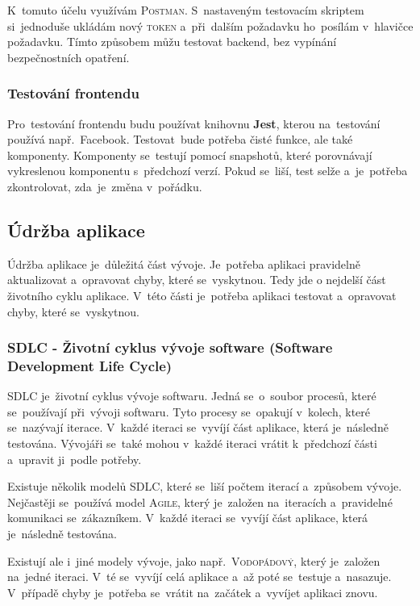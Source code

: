 \documentclass[14pt,a4paper]{article}
\begin{document}
        K~tomuto účelu využívám \textsc{Postman}. S~nastaveným testovacím skriptem si~jednoduše ukládám nový \textsc{token} a~při~dalším požadavku ho~posílám v~hlavičce požadavku. Tímto způsobem můžu testovat backend, bez vypínání bezpečnostních opatření.

        \subsubsection{Testování frontendu}
        Pro~testování frontendu budu používat knihovnu \textbf{Jest}, kterou na~testování používá např.~Facebook. Testovat~bude potřeba čisté funkce, ale také komponenty. Komponenty se~testují pomocí snapshotů, které porovnávají vykreslenou komponentu s~předchozí verzí. Pokud se~liší, test selže a~je~potřeba zkontrolovat, zda~je~změna v~pořádku. \parencite{jestjsTestingReact}

        \subsection{Údržba aplikace}
        Údržba aplikace je~důležitá část vývoje. Je~potřeba aplikaci pravidelně aktualizovat a~opravovat chyby, které se~vyskytnou.
        Tedy jde o nejdelší část životního cyklu aplikace. V~této části je~potřeba aplikaci testovat a~opravovat chyby, které se~vyskytnou.
            
            \subsubsection{SDLC - Životní cyklus vývoje software (Software Development Life Cycle)}
            SDLC je~životní cyklus vývoje softwaru. Jedná se~o~soubor procesů, které se~používají při~vývoji softwaru.
            Tyto procesy se~opakují v~kolech, které se~nazývají iterace. V~každé iteraci se~vyvíjí část aplikace, která je~následně testována.
            Vývojáři se~také mohou v~každé iteraci vrátit k~předchozí části a~upravit ji~podle potřeby.
            
            Existuje několik modelů \textsc{SDLC}, které se~liší počtem iterací a~způsobem vývoje. Nejčastěji se~používá model \textsc{Agile},
            který je~založen na~iteracích a~pravidelné komunikaci se~zákazníkem. V~každé iteraci se~vyvíjí část aplikace, která je~následně testována.
            
            Existují ale i~jiné modely vývoje, jako např.~\textsc{Vodopádový}, který je~založen na~jedné iteraci.
            V~té se~vyvíjí celá aplikace a~až poté se~testuje a~nasazuje.
            V~případě chyby je~potřeba se~vrátit na~začátek a~vyvíjet aplikaci znovu.
\end{document}
